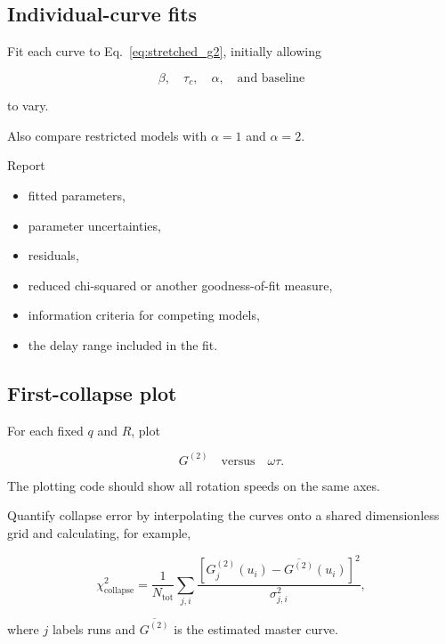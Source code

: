 \documentclass[11pt,letterpaper]{article}
\newcommand{\Gnorm}{G^{(2)}}
\begin{document}
\subsection{Individual-curve fits}

Fit each curve to Eq.~\eqref{eq:stretched_g2}, initially allowing

\begin{equation}
    \beta,\quad \tau_c,\quad \alpha,\quad \text{and baseline}
\end{equation}

to vary.

Also compare restricted models with $\alpha=1$ and $\alpha=2$.

Report

\begin{itemize}[leftmargin=2em]
    \item fitted parameters,
    \item parameter uncertainties,
    \item residuals,
    \item reduced chi-squared or another goodness-of-fit measure,
    \item information criteria for competing models,
    \item the delay range included in the fit.
\end{itemize}

\subsection{First-collapse plot}

For each fixed $q$ and $R$, plot

\begin{equation}
    \Gnorm
    \quad \text{versus} \quad
    \omega\tau.
\end{equation}

The plotting code should show all rotation speeds on the same axes.

Quantify collapse error by interpolating the curves onto a shared
dimensionless grid and calculating, for example,

\begin{equation}
    \chi^2_{\mathrm{collapse}}
    =
    \frac{1}{N_{\mathrm{tot}}}
    \sum_{j,i}
    \frac{
    \left[
    \Gnorm_j(u_i)-\overline{\Gnorm}(u_i)
    \right]^2
    }{
    \sigma_{j,i}^2
    },
    \label{eq:collapse_error}
\end{equation}

where $j$ labels runs and $\overline{\Gnorm}$ is the estimated master curve.
\end{document}
